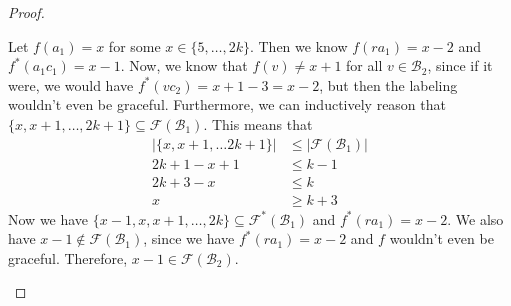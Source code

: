 \documentclass[10pt]{article}
\theoremstyle{definition}
\begin{document}
\begin{proof}
\begin{enumerate}
      Let $f(a_1) = x$ for some $x \in \{5, \dots, 2k\}$. Then we know $f(ra_1) = x - 2$ and $f^*(a_1 c_1) = x - 1$. Now, we know that $f(v) \neq x + 1$ for all $v \in \mathcal{B}_2$, since if it were, we would have $f^*(v c_2) = x + 1 - 3 = x - 2$, but then the labeling wouldn't even be graceful. Furthermore, we can inductively reason that $\{x, x+1, \dots, 2k + 1\} \subseteq \mathcal{F}(\mathcal{B}_1)$. This means that
      \begin{align*}
        |\{x, x+1, \dots 2k + 1\}| &\le |\mathcal{F}(\mathcal{B}_1)| \\
        2k + 1 - x + 1 &\le k - 1 \\
        2k + 3 - x &\le k \\
        x &\ge k + 3
      \end{align*}
      Now we have $\{x-1,x,x+1,\dots,2k\} \subseteq \mathcal{F}^*(\mathcal{B}_1)$ and $f^*(r a_1) = x - 2$. We also have $x - 1 \notin \mathcal{F}(\mathcal{B}_1)$, since we have $f^*(ra_1) = x - 2$ and $f$ wouldn't even be graceful. Therefore, $x - 1 \in \mathcal{F}(\mathcal{B}_2)$.


\end{enumerate}
\end{proof}
\end{document}
